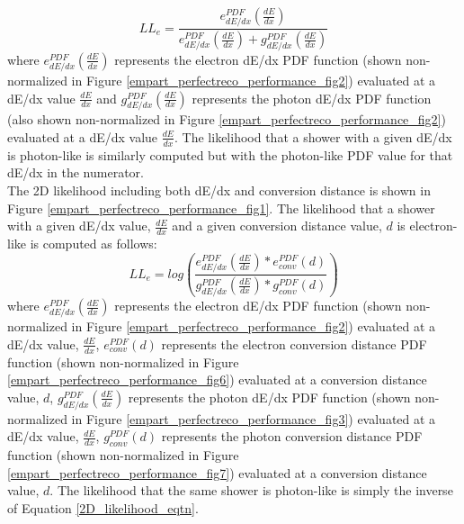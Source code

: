 \begin{equation}\label{1D_dedx_likelihood_eqtn}
LL_e=\frac{e_{dE/dx}^{PDF}(\frac{dE}{dx})}{ e_{dE/dx}^{PDF}(\frac{dE}{dx}) + g_{dE/dx}^{PDF}(\frac{dE}{dx}) }
\end{equation}
where $e_{dE/dx}^{PDF}(\frac{dE}{dx})$ represents the electron dE/dx PDF function (shown non-normalized in Figure \ref{empart_perfectreco_performance_fig2}) evaluated at a dE/dx value $\frac{dE}{dx}$ and $g_{dE/dx}^{PDF}(\frac{dE}{dx})$ represents the photon dE/dx PDF function (also shown non-normalized in Figure \ref{empart_perfectreco_performance_fig2}) evaluated at a dE/dx value $\frac{dE}{dx}$. The likelihood that a shower with a given dE/dx is photon-like is similarly computed but with the photon-like PDF value for that dE/dx in the numerator.\\

The 2D likelihood including both dE/dx and conversion distance is shown in Figure \ref{empart_perfectreco_performance_fig1}. The likelihood that a shower with a given dE/dx value, $\frac{dE}{dx}$ and a given conversion distance value, $d$ is electron-like is computed as follows: 
\begin{equation}\label{2D_likelihood_eqtn}
LL_e=log( \frac{e_{dE/dx}^{PDF}(\frac{dE}{dx}) * e_{conv}^{PDF}(d)}{g_{dE/dx}^{PDF}(\frac{dE}{dx}) * g_{conv}^{PDF}(d)} )
\end{equation}
where $e_{dE/dx}^{PDF}(\frac{dE}{dx})$ represents the electron dE/dx PDF function (shown non-normalized in Figure \ref{empart_perfectreco_performance_fig2}) evaluated at a dE/dx value, $\frac{dE}{dx}$, $e_{conv}^{PDF}(d)$ represents the electron conversion distance PDF function (shown non-normalized in Figure \ref{empart_perfectreco_performance_fig6}) evaluated at a conversion distance value, $d$, $g_{dE/dx}^{PDF}(\frac{dE}{dx})$ represents the photon dE/dx PDF function (shown non-normalized in Figure \ref{empart_perfectreco_performance_fig3}) evaluated at a dE/dx value, $\frac{dE}{dx}$, $g_{conv}^{PDF}(d)$ represents the photon conversion distance PDF function (shown non-normalized in Figure \ref{empart_perfectreco_performance_fig7}) evaluated at a conversion distance value, $d$. The likelihood that the same shower is photon-like is simply the inverse of Equation \ref{2D_likelihood_eqtn}.\\



